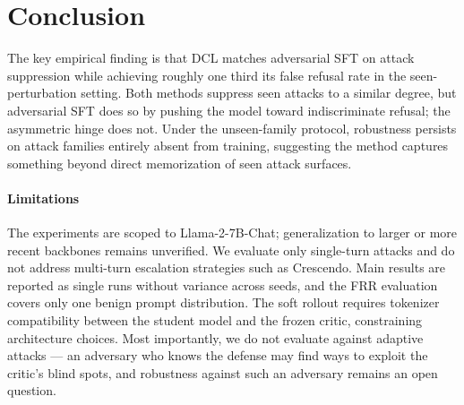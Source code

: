 \documentclass{article}
\begin{document}

\section{Conclusion}
\label{sec:conclusion}

The key empirical finding is that DCL matches adversarial SFT on attack suppression while achieving roughly one third its false refusal rate in the seen-perturbation setting. Both methods suppress seen attacks to a similar degree, but adversarial SFT does so by pushing the model toward indiscriminate refusal; the asymmetric hinge does not. Under the unseen-family protocol, robustness persists on attack families entirely absent from training, suggesting the method captures something beyond direct memorization of seen attack surfaces.

\paragraph{Limitations}
The experiments are scoped to Llama-2-7B-Chat; generalization to larger or 
more recent backbones remains unverified. We evaluate only single-turn attacks 
and do not address multi-turn escalation strategies such as Crescendo. Main 
results are reported as single runs without variance across seeds, and the FRR 
evaluation covers only one benign prompt distribution. The soft rollout requires 
tokenizer compatibility between the student model and the frozen critic, 
constraining architecture choices. Most importantly, we do not evaluate against 
adaptive attacks --- an adversary who knows the defense may find ways to exploit 
the critic's blind spots, and robustness against such an adversary remains an 
open question.

\newpage


\end{document}
